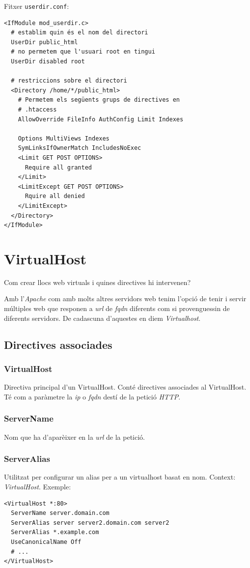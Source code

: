 \documentclass[a4paper, 11pt]{article}
\begin{document}
Fitxer \verb+userdir.conf+:

\begin{verbatim}
<IfModule mod_userdir.c>
  # establim quin és el nom del directori
  UserDir public_html
  # no permetem que l'usuari root en tingui
  UserDir disabled root

  # restriccions sobre el directori
  <Directory /home/*/public_html>
    # Permetem els següents grups de directives en 
    # .htaccess
    AllowOverride FileInfo AuthConfig Limit Indexes
    
    Options MultiViews Indexes 
    SymLinksIfOwnerMatch IncludesNoExec
    <Limit GET POST OPTIONS>
      Require all granted
    </Limit>
    <LimitExcept GET POST OPTIONS>
      Rquire all denied
    </LimitExcept>
  </Directory>
</IfModule>
\end{verbatim}

\section{VirtualHost}
Com crear llocs web virtuals i quines directives hi intervenen? 

Amb l'\textit{Apache} com amb molts altres servidors web tenim l'opció de tenir i servir múltiples web que responen a \textit{url} de \textit{fqdn} diferents com si provenguessin de diferents servidors. De cadascuna d'aquestes en diem \textit{Virtualhost}.
\subsection{Directives associades}
\subsubsection{VirtualHost}
Directiva principal d'un VirtualHost. Conté directives associades al VirtualHost. Té com a paràmetre la \textit{ip} o \textit{fqdn} destí de la petició \textit{HTTP}.
\subsubsection{ServerName}
Nom que ha d'aparèixer en la \textit{url} de la petició.
\subsubsection{ServerAlias}
Utilitzat per configurar un alias per a un virtualhost basat en nom. Context: \textit{VirtualHost}. Exemple:
\begin{verbatim}
<VirtualHost *:80>
  ServerName server.domain.com
  ServerAlias server server2.domain.com server2
  ServerAlias *.example.com
  UseCanonicalName Off
  # ...
</VirtualHost> 
\end{verbatim}
\end{document}
